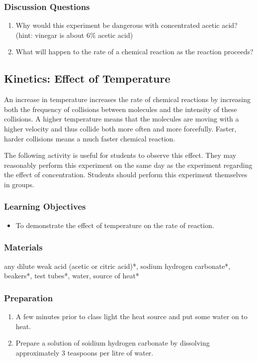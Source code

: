 \subsubsection*{Discussion Questions}
\begin{enumerate}
\item{Why would this experiment be dangerous with concentrated acetic acid? (hint: vinegar is about 6\% acetic acid)}
\item{What will happen to the rate of a chemical reaction as the reaction proceeds?}
\end{enumerate}

\subsection{Kinetics: Effect of Temperature}

An increase in temperature increases the rate of chemical reactions by increasing both the frequency of collisions between molecules and the intensity of these collisions. A higher temperature means that the molecules are moving with a higher velocity and thus collide both more often and more forcefully. Faster, harder collisions means a much faster chemical reaction.

The following activity is useful for students to observe this effect. They may reasonably perform this experiment on the same day as the experiment regarding the effect of concentration. Students should perform this experiment themselves in groups.

\subsubsection*{Learning Objectives}
\begin{itemize}
\item{To demonstrate the effect of temperature on the rate of reaction.}
\end{itemize}

\subsubsection*{Materials}
any dilute weak acid (acetic or citric acid)*, sodium hydrogen carbonate*, beakers*, test tubes*, water, source of heat*

\subsubsection*{Preparation}
\begin{enumerate}
\item{A few minutes prior to class light the heat source and put some water on to heat.}
\item{Prepare a solution of soidium hydrogen carbonate by dissolving approximately 3 teaspoons per litre of water.}
\end{enumerate}

